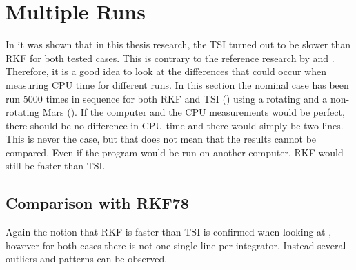 \section{Multiple Runs}
\label{sec:multipleRuns}
In  it was shown that in this thesis research, the \ac{TSI} turned out to be slower than \ac{RKF} for both tested cases. This is contrary to the reference research by \cite{scott2008high} and \cite{bergsma2016application}. Therefore, it is a good idea to look at the differences that could occur when measuring CPU time for different runs. In this section the nominal case has been run 5000 times in sequence for both \ac{RKF} and \ac{TSI} () using a rotating and a non-rotating Mars (). If the computer and the CPU measurements would be perfect, there should be no difference in CPU time and there would simply be two lines.  This is never the case, but that does not mean that the results cannot be compared. Even if the program would be run on another computer, \ac{RKF} would still be faster than \ac{TSI}. 


\subsection{Comparison with \ac{RKF78}}
\label{subsec:timeCompRKF}
Again the notion that \ac{RKF} is faster than \ac{TSI} is confirmed when looking at , however for both cases there is not one single line per integrator. Instead several outliers and patterns can be observed. 

%
%
%

